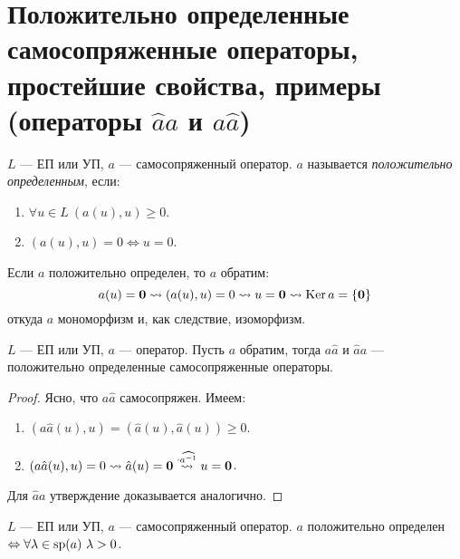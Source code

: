 \section{Положительно определенные самосопряженные операторы, простейшие свойства, примеры (операторы $\hat{a}a$ и $a\hat{a}$)}

\begin{defn}
    $L$ --- ЕП или УП, $a$ --- самосопряженный оператор. $a$ называется \textit{положительно определенным}, если:
    \begin{enumerate}
        \item $\forall u \in L\ (a(u), u) \ge 0$.
        \item $(a(u), u) = 0 \Leftrightarrow u = 0$.
    \end{enumerate}
\end{defn}

\begin{rem}
    Если $a$ положительно определен, то $a$ обратим:
    $$a(u) = \mathbf{0} \leadsto (a(u), u) = 0 \leadsto u = \mathbf{0} \leadsto \operatorname{Ker} a = \{\mathbf{0}\}$$
    откуда $a$ мономорфизм и, как следствие, изоморфизм.
\end{rem}

\begin{thm}
    $L$ --- ЕП или УП, $a$ --- оператор. Пусть $a$ обратим, тогда $a\hat{a}$ и $\hat{a}a$ --- положительно определенные самосопряженные операторы.
\end{thm}

\begin{proof}
    Ясно, что $a \hat{a}$ самосопряжен. Имеем:
    \begin{enumerate}
        \item $(a\hat{a}(u), u) = (\hat{a}(u), \hat{a}(u)) \ge 0$.
        \item $(a\hat{a}(u), u) = 0 \leadsto \hat{a}(u) = \mathbf{0} \stackrel{\cdot \widehat{a^{-1}}}{\leadsto} u = \mathbf{0}$.
    \end{enumerate}
    Для $\hat{a} a$ утверждение доказывается аналогично.
\end{proof}

\begin{thm}
    $L$ --- ЕП или УП, $a$ --- самосопряженный оператор. $a$ положительно определен $\Leftrightarrow \forall \lambda \in \operatorname{sp}(a)\ \lambda > 0$.
\end{thm}

